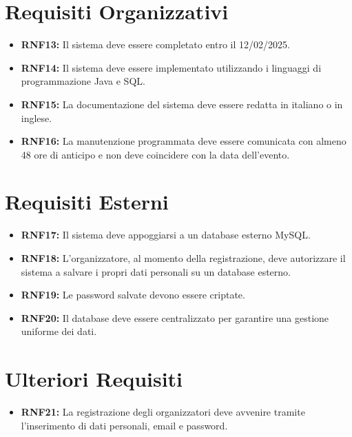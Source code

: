 \documentclass[a4paper,12pt]{article}
\begin{document}
\section*{\textcolor{sectioncolor}{Requisiti Organizzativi}}
\textcolor{textcolor}{
\begin{itemize}
    \item \textbf{RNF13:} Il sistema deve essere completato entro il 12/02/2025.
    \item \textbf{RNF14:} Il sistema deve essere implementato utilizzando i linguaggi di programmazione Java e SQL.
    \item \textbf{RNF15:} La documentazione del sistema deve essere redatta in italiano o in inglese.
    \item \textbf{RNF16:} La manutenzione programmata deve essere comunicata con almeno 48 ore di anticipo e non deve coincidere con la data dell’evento.
\end{itemize}
}

\section*{\textcolor{sectioncolor}{Requisiti Esterni}}
\textcolor{textcolor}{
\begin{itemize}
    \item \textbf{RNF17:} Il sistema deve appoggiarsi a un database esterno MySQL.
    \item \textbf{RNF18:} L’organizzatore, al momento della registrazione, deve autorizzare il sistema a salvare i propri dati personali su un database esterno.
    \item \textbf{RNF19:} Le password salvate devono essere criptate.
    \item \textbf{RNF20:} Il database deve essere centralizzato per garantire una gestione uniforme dei dati.
\end{itemize}
}

\section*{\textcolor{sectioncolor}{Ulteriori Requisiti}}
\textcolor{textcolor}{
\begin{itemize}
    \item \textbf{RNF21:} La registrazione degli organizzatori deve avvenire tramite l'inserimento di dati personali, email e password.
\end{itemize}
}
\end{document}
